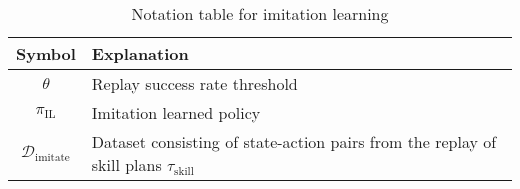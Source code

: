 \begin{table}[h!]
\large
\centering
\begin{adjustbox}{width=\columnwidth} %
\begin{tabular}{|c|p{}|} %
\hline
\textbf{Symbol} & \textbf{Explanation} \\ \hline

$\theta$ & Replay success rate threshold \\ \hline
$\pi_{\text{IL}}$ & Imitation learned policy \\ \hline
$\mathcal{D}_{\text{imitate}}$ & Dataset consisting of state-action pairs from the replay of skill plans $\tau_{\text{skill}}$ \\ \hline

\end{tabular}
\end{adjustbox}
\caption{Notation table for imitation learning}
\label{tab:IL_notation}
\end{table}